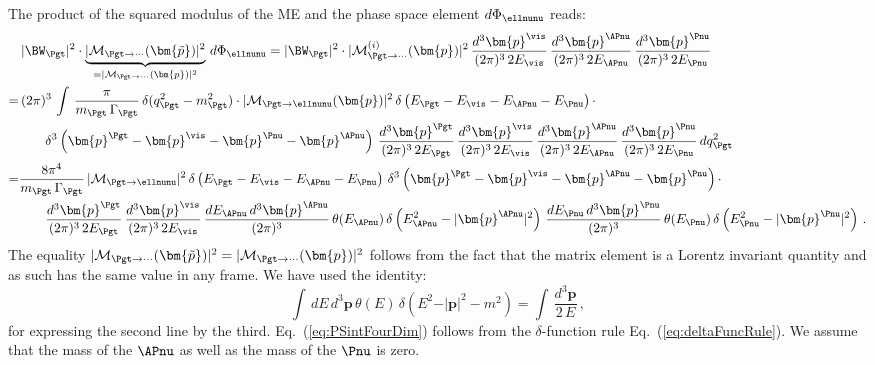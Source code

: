 The product of the squared modulus of the ME and the phase space
element $d\Phi_{\ellnunu}$ reads:
\begin{align}
& \, \vert \BW_{\Pgt} \vert^{2} \cdot
\underbrace{\vert\mathcal{M}_{\Pgt\to\cdots}(\bm{\tilde{p}})\vert^{2}}_{=
\vert\mathcal{M}_{\Pgt\to\cdots}(\bm{p})\vert^{2}} \,
 d\Phi_{\ellnunu} = \vert \BW_{\Pgt} \vert^{2} \cdot \vert \mathcal{M}^{(i)}_{\Pgt\to\cdots}(\bm{p})
\vert^{2} \, 
  \frac{d^{3}\bm{p}^{\vis}}{(2\pi)^{3} \, 2 E_{\vis}} \, 
  \frac{d^{3}\bm{p}^{\APnu}}{(2\pi)^{3} \, 2 E_{\APnu}} \,
  \frac{d^{3}\bm{p}^{\Pnu}}{(2\pi)^{3} \, 2 E_{\Pnu}} \nonumber \\
= & \, (2\pi)^{3} \, \int \, \frac{\pi}{m_{\Pgt} \, \Gamma_{\Pgt}} \,
\delta ( q_{\Pgt}^{2} - m_{\Pgt}^{2} ) \cdot
\vert\mathcal{M}_{\Pgt \to \ellnunu}(\bm{p})\vert^{2} \, \delta \left(
  E_{\Pgt} - E_{\vis} - E_{\APnu} - E_{\Pnu} \right) \cdot \nonumber \\
& \qquad
\delta^{3} \left( \bm{p}^{\Pgt} - \bm{p}^{\vis} - \bm{p}^{\Pnu} - \bm{p}^{\APnu} \right) \, \frac{d^{3}\bm{p}^{\Pgt}}{(2\pi)^{3} \, 2 E_{\Pgt}} \,
  \frac{d^{3}\bm{p}^{\vis}}{(2\pi)^{3} \, 2 E_{\vis}} \, 
  \frac{d^{3}\bm{p}^{\APnu}}{(2\pi)^{3} \, 2 E_{\APnu}} \, 
  \frac{d^{3}\bm{p}^{\Pnu}}{(2\pi)^{3} \, 2 E_{\Pnu}} \, dq^{2}_{\Pgt} \nonumber \\
= & \frac{8\pi^{4}}{m_{\Pgt} \, \Gamma_{\Pgt}} \, \vert\mathcal{M}_{\Pgt \to
  \ellnunu}\vert^{2} \, \delta \left( E_{\Pgt} - E_{\vis} - E_{\APnu} - E_{\Pnu} \right) \, \delta^{3} \left( \bm{p}^{\Pgt} -
  \bm{p}^{\vis} - \bm{p}^{\APnu} - \bm{p}^{\Pnu} \right)  \cdot \nonumber \\
& \qquad
  \frac{d^{3}\bm{p}^{\Pgt}}{(2\pi)^{3} \, 2 E_{\Pgt}} \,
  \frac{d^{3}\bm{p}^{\vis}}{(2\pi)^{3} \, 2 E_{\vis}} \,
  \frac{dE_{\APnu} \, d^{3}\bm{p}^{\APnu}}{(2\pi)^{3}} \,
  \theta(E_{\APnu}) \, \delta \left( E_{\APnu}^{2} - \vert\bm{p}^{\APnu}\vert^{2} \right) \,
  \frac{dE_{\Pnu} \, d^{3}\bm{p}^{\Pnu}}{(2\pi)^{3}} \,
  \theta(E_{\Pnu}) \, \delta \left( E_{\Pnu}^{2} - \vert\bm{p}^{\Pnu}\vert^{2} \right) \, .
\end{align}
The equality
$\vert\mathcal{M}_{\Pgt\to\cdots}(\bm{\tilde{p}})\vert^{2} =
\vert\mathcal{M}_{\Pgt\to\cdots}(\bm{p})\vert^{2}$
follows from the fact that the matrix element is a Lorentz invariant
quantity and as such has the same value in any frame.
We have used the identity:
\begin{equation}
\int \, dE \, d^{3}\bm{p} \, \theta(E) \, \delta \left( E^{2} -
  \vert\bm{p}\vert^{2} - m^{2} \right) = \int \, \frac{d^{3}\bm{p}}{2
  \, E} \, ,
\label{eq:PSintFourDim}
\end{equation}
for expressing the second line by the third.
Eq.~(\ref{eq:PSintFourDim}) follows from the $\delta$-function rule Eq.~(\ref{eq:deltaFuncRule}).
We assume that the mass of the $\APnu$ as well as the mass of the $\Pnu$ is zero.

